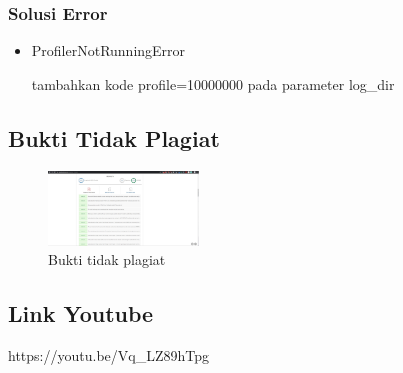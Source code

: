\subsubsection{Solusi Error}
\hfill\break
\begin{itemize}
\item ProfilerNotRunningError

tambahkan kode profile=10000000 pada parameter log\_dir
\end{itemize}

\subsection{Bukti Tidak Plagiat}
\begin{figure}[H]
	\includegraphics[width=4cm]{figures/1174066/7/buktiplagiat.jpg}
	\centering
	\caption{Bukti tidak plagiat}
\end{figure}

\subsection{Link Youtube}
https://youtu.be/Vq\_LZ89hTpg
